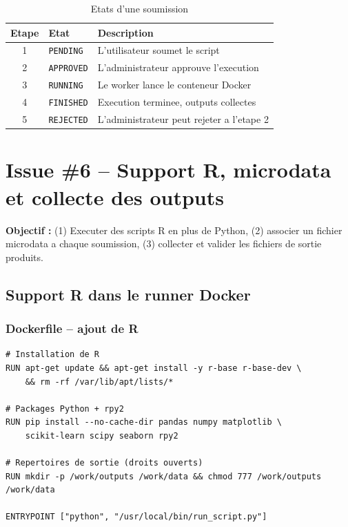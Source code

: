 \documentclass[12pt,a4paper]{article}
\newcommand{\statut}[1]{\texttt{\textcolor{myblue}{#1}}}
\begin{document}
\begin{table}[H]
\centering
\caption{Etats d'une soumission}
\begin{tabularx}{\textwidth}{@{}clX@{}}
\toprule
Etape & Etat & Description \\
\midrule
1 & \statut{PENDING}  & L'utilisateur soumet le script \\
2 & \statut{APPROVED} & L'administrateur approuve l'execution \\
3 & \statut{RUNNING}  & Le worker lance le conteneur Docker \\
4 & \statut{FINISHED} & Execution terminee, outputs collectes \\
5 & \statut{REJECTED} & L'administrateur peut rejeter a l'etape 2 \\
\bottomrule
\end{tabularx}
\end{table}

\section{Issue \#6 -- Support R, microdata et collecte des outputs}

\noindent\colorbox{myblue!10}{\parbox{\linewidth}{\vspace{4pt}
\textbf{Objectif :} (1) Executer des scripts R en plus de Python,
(2) associer un fichier microdata a chaque soumission,
(3) collecter et valider les fichiers de sortie produits.
\vspace{4pt}}}

\vspace{6pt}

\subsection{Support R dans le runner Docker}

\subsubsection*{Dockerfile -- ajout de R}

\begin{lstlisting}
# Installation de R
RUN apt-get update && apt-get install -y r-base r-base-dev \
    && rm -rf /var/lib/apt/lists/*

# Packages Python + rpy2
RUN pip install --no-cache-dir pandas numpy matplotlib \
    scikit-learn scipy seaborn rpy2

# Repertoires de sortie (droits ouverts)
RUN mkdir -p /work/outputs /work/data && chmod 777 /work/outputs /work/data

ENTRYPOINT ["python", "/usr/local/bin/run_script.py"]
\end{lstlisting}
\end{document}
